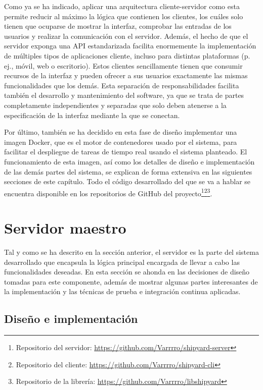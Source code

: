 Como ya se ha indicado, aplicar una arquitectura cliente-servidor como esta
permite reducir al máximo la lógica que contienen los clientes, los cuáles solo
tienen que ocuparse de mostrar la interfaz, comprobar las entradas de los
usuarios y realizar la comunicación con el servidor. Además, el hecho de que el
servidor exponga una API estandarizada facilita enormemente la implementación de
múltiples tipos de aplicaciones cliente, incluso para distintas plataformas (p.
ej., móvil, web o escritorio). Estos clientes sencillamente tienen que consumir
recursos de la interfaz y pueden ofrecer a sus usuarios exactamente las mismas
funcionalidades que los demás. Esta separación de responsabilidades facilita
también el desarrollo y mantenimiento del software, ya que se trata de partes
completamente independientes y separadas que solo deben atenerse a la
especificación de la interfaz mediante la que se conectan.

Por último, también se ha decidido en esta fase de diseño implementar una imagen
Docker, que es el motor de contenedores usado por el sistema, para facilitar el
despliegue de tareas de tiempo real usando el sistema planteado. El
funcionamiento de esta imagen, así como los detalles de diseño e implementación
de las demás partes del sistema, se explican de forma extensiva en las
siguientes secciones de este capítulo. Todo el código desarrollado del que se va
a hablar se encuentra disponible en los repositorios de GitHub del
proyecto\footnote{Repositorio del servidor:
    \url{https://github.com/Varrrro/shipyard-server}}\footnote{Repositorio del
    cliente: \url{https://github.com/Varrrro/shipyard-cli}}\footnote{Repositorio de
    la librería: \url{https://github.com/Varrrro/libshipyard}}.

\section{Servidor maestro}

Tal y como se ha descrito en la sección anterior, el servidor es la parte del
sistema desarrollado que encapsula la lógica principal encargada de llevar a
cabo las funcionalidades deseadas. En esta sección se ahonda en las decisiones
de diseño tomadas para este componente, además de mostrar algunas partes
interesantes de la implementación y las técnicas de prueba e integración
continua aplicadas.

\subsection{Diseño e implementación}
\label{sec:server-design}


